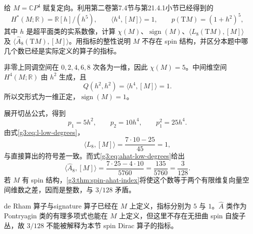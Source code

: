 \begin{optionalexercise}\label{g3:ex:cp4-index-comparison}
	给 \(M=\mathbb CP^4\) 赋复定向。利用第二卷第7.4节与第21.4.1小节已经得到的
	\[
		H^*(M;\mathbb R)=\mathbb R[h]/(h^5),
		\qquad \langle h^4,[M]\rangle=1,
		\qquad p(\mathrm TM)=(1+h^2)^5,
	\]
	其中 \(h\) 是超平面类的实系数像，计算 \(\chi(M)\)、\(\operatorname{sign}(M)\)、\(\langle L_8(\mathrm TM),[M]\rangle\) 及
	\(\langle\widehat A_8(\mathrm TM),[M]\rangle\)。用指标的整性说明 \(M\) 不存在 spin 结构，并区分本题中哪几个数已经是实际定义的算子的指标。
\end{optionalexercise}
\begin{solution}
	非零上同调空间在 \(0,2,4,6,8\) 次各为一维，因此 \(\chi(M)=5\)。中间维空间 \(H^4(M;\mathbb R)\) 由 \(h^2\) 生成，且
	\[
		Q(h^2,h^2)=\langle h^4,[M]\rangle=1.
	\]
	所以交形式为一维正定，\(\operatorname{sign}(M)=1\)。

	展开切丛公式，得到
	\[
		p_1=5h^2,\qquad p_2=10h^4,\qquad p_1^2=25h^4.
	\]
	由式\eqref{g3:eq:l-low-degrees}，
	\[
		\langle L_8,[M]\rangle
		=\frac{7\cdot10-25}{45}=1,
	\]
	与直接算出的符号差一致。而式\eqref{g3:eq:ahat-low-degrees}给出
	\[
		\langle\widehat A_8,[M]\rangle
		=\frac{7\cdot25-4\cdot10}{5760}
		=\frac{135}{5760}=\frac3{128}.
	\]
	若 \(M\) 有 spin 结构，\cref{g3:thm:spin-ahat-index}将使这个数等于两个有限维复向量空间维数之差，因而是整数，与 \(3/128\) 矛盾。

	de Rham 算子与signature 算子已经在 \(M\) 上定义，指标分别为 \(5\) 与 \(1\)。\(\widehat A\) 类作为 Pontryagin 类的有理多项式也能在 \(M\) 上定义，但这里不存在无扭曲 spin 自旋子丛，故 \(3/128\) 不能被解释为本节 spin Dirac 算子的指标。
\end{solution}

